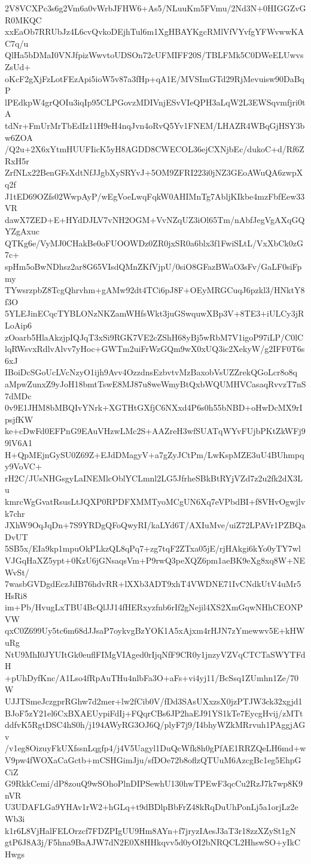 2V8VCXPc3s6g2Vm6a0vWrbJFHW6+As5/NLuuKm5FVmu/2Nd3N+0HIGGZvGR0MKQC
xxEaOb7RRUbJz4L6cvQvkoDEjhTul6m1XgHBAYKgcRMlVfVYvfgYFWvwwKAC7q/u
QlHa5bDMaI0VNJfpizWwvtoUDSOn72cUFMIFF20S/TBLFMk5C0DWeELUwvsZsUd+
oKcF2gXjFzLotFEzApi5ioW5v87a3fHp+qA1E/MVSImGTd29RjMevuisw90DaBqP
lPEdkpW4grQOIu3iqIp95CLPGovzMDIVnjESvVIeQPH3aLqW2L3EWSqvmfjri0tA
tdNr+FmUrMrTbEdIz11H9eH4nqJvn4oRvQ5Yv1FNEM/LHAZR4WBqGjHSY3bw6ZOA
/Q2u+2X6xYtmHUUFIicK5yH8AGDD8CWECOL36ejCXNjbEc/dukoC+d/Rf6ZRxH5r
ZrfNLx22BenGFsXdtNfJJgbXySRYvJ+5OM9ZFRI223i0jNZ3GEoAWuQA6zwpXq2f
J1tED69OZfs02WwpAyP/wEgVoeLwqFqkW0AHIMnTg7AbljKIkbe4mzFbfEew33VR
dawX7ZED+E+HYdDJLV7vNH2OGM+VvNZqUZ3iOl65Tm/nAbfJegVgAXqGQYZgAxuc
QTKg6e/VyMJ0CHakBe0oFUOOWDz0ZR0jxSR0a6blx3f1FwiSLtL/VxXbCk0zG7c+
spHm5oBwNDhsz2ar8G65VIsdQMnZKfVjpU/0siO8GFazBWaO3sFv/GaLF0siFpmy
TYwsrzpbZ8TcgQhrvhm+gAMw92dt4TCi6pJ8F+OEyMRGCuqJ6pzkl3/HNktY8f3O
5YLEJinECqcTYBLONzNKZamWHfsWkt3juGSwquwXBp3V+8TE3+iULCy3jRLoAip6
zOoarb5HlaAkzjpIQJqT3xSi9RGK7VE2cZShH68yBj5wRbM7V1igoP97iLP/C0lC
lqRWsvxRdlvAlvv7yHoc+GWTm2uiFrWzGQm9wX0xUQ3ic2XekyW/g2IFF0T6s6xJ
IBoiDcSGoUcLVcNzyO1ijh9Avv4OzzdnsEzbvtvMzBaxobVsUZZrekQGoLcr8o8q
aMpwZunxZ9yJoH18bmtTswE8MJ87u8weWmyBtQxbWQUMHVCasaqRvvzT7nS7dMDc
0v9E1JHM8bMBQIvYNrk+XGTHtGXfjC6NXxd4P6s0h55bNBD+oHwDcMX9rIpsjfKW
ke+cDwFd0EFPnG9EAuVHzwLMc2S+AAZreH3wfSUATqWYvFUjbPKtZkWFj99lV6A1
H+QpMEjnGySU0Z69Z+EJdDMagyV+a7gZyJCtPm/LwKspMZE3uU4BUhmpqy9VoVC+
rH2C/JUsNHGsgyLaINEMlcOblYCLmnl2LG5JfrheSBkBtRYjVZd7z2u2fk2dX3Lu
kmrcWgGvatRsusLtJQXP0RPDFXMMTyoMCgUN6Xq7eVPbdBI+f8VHvOgwjlvk7chr
JXhW9OqJqDn+7S9YRDgQFoQwyRI/kaLYd6T/AXIuMve/uiZ72LPAVr1PZBQaDvUT
5SB5x/EIa9kp1mpuOkPLkzQL8qPq7+zg7tqF2ZTxa05jE/rjHAkgi6kYo0yTY7wl
VJGqHaXZ5ypt+0KzU6jGNsaqsVm+P9rwQ3peXQZ6pm1aeBK9eXg8xq8W+NEWvSt/
7wasbGVDgdEczJiIB76hdvRR+lXXb3ADT9xhT4VWDNE71IvCNdkUtV4uMr5HsRi8
im+Pb/HvugLxTBU4BcQlJJ14fHERxyzfnb6rIf2gNejil4XS2XmGqwNHhCEONPVW
qxC0Z699Uy5tc6m68dJJsaP7oykvgBzYOK1A5xAjxm4rHJN7zYmewwv5E+kHWuRg
NtU9MhI0JYUItGk0euflFIMgVIAged0rIjqNfF9CR0y1jnzyVZVqCTCTaSWYTFdH
+pUhDyfKnc/A1Lso4fRpAuTHu4nlbFa3O+aFs+vi4yj11/BcSsq1ZUmhn1Ze/70W
UJJTSmeJczgprRGhw7d2mer+lw2fCib0V/fDd3SAsUXxzsX0jzPTJW3ck32xgjd1
BJoF5zY21el6CxBXAEUypiFdIj+FQqrCBs6JP2haEJ91YS1kTe7EycgHvij/zMTt
ddfvK5RgtDSC4hS0h/j194AWyRG3OJ6Q/plyF7j9/I4bhyWZkMRrvuh1PAggjAGv
/v1eg8OizuyFkUXfssnLqgfp4/j4V5Uagyl1DuQcWfk8h0gPfAE1RRZQeLH6md+w
V9pw4fWOXaCaGctb+mCSHGimJju/sfDOe72b8oflzQTUuM6AzcgBc1eg5EhpGCiZ
G9RkkCemi/dP8zouQ9wSOhoPlnDIPSewhU130hwTPEwF3qcCu2RzJ7k7wp8K9nVR
U3UDAFLGa9YHAv1rW2+hGLq+t9dBDlpBbFrZ48kRqDuUhPonLj5a1orjLz2eWb3i
k1r6L8VjHalFELOrzcf7FDZPIgUU9Hm8AYn+f7jryzIAesJ3aT3r18zzXZySt1gN
gtP6J8A3j/F5hna9BaAJW7dN2E0X8HHkqvv5d0yOI2bNRQCL2HhswSO+yIkCHwgs
